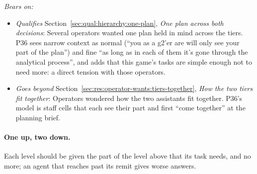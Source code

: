 \noindent\textit{Bears on:}
\begin{itemize}[leftmargin=1.2em,itemsep=1pt]\small
\item \textit{Qualifies} Section~\ref{sec:qual:hierarchy:one-plan}, \emph{One plan across both decisions}: Several operators wanted one plan held in mind across the tiers. P36 sees narrow context as normal (``you as a g2'er are will only see your part of the plan'') and fine ``as long as in each of them it's gone through the analytical process'', and adds that this game's tasks are simple enough not to need more: a direct tension with those operators.
\item \textit{Goes beyond} Section~\ref{sec:res:operator-wants:tiers-together}, \emph{How the two tiers fit together}: Operators wondered how the two assistants fit together. P36's model is staff cells that each see their part and first ``come together'' at the planning brief.
\end{itemize}


\label{sec:qual:practitioner:pt-one-up-two-down}\paragraph{One up, two down.}
Each level should be given the part of the level above that its task needs, and no more; an agent that reaches past its remit gives worse answers.

